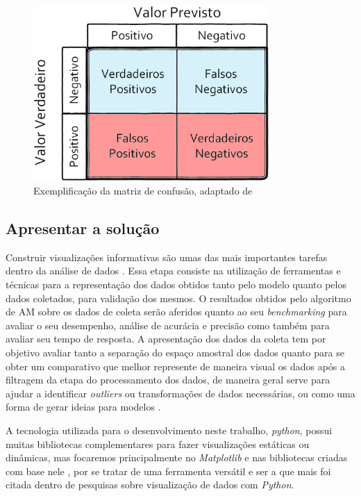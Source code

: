\begin{figure}[!htb]
	\centering
	\includegraphics[width=0.8\textwidth]{figuras/matriz_consusao.eps}
	\caption{Exemplificação da matriz de confusão, adaptado de }
	\label{matriz_consusao}
\end{figure}

\subsection{Apresentar a solução}
Construir visualizações informativas são umas das mais importantes tarefas dentro da análise de dados \cite{McKinney2012datapython}. Essa etapa consiste na utilização de ferramentas e técnicas para a representação dos dados obtidos tanto pelo modelo quanto pelos dados coletados, para validação dos mesmos. O resultados obtidos pelo algoritmo de AM sobre os dados de coleta serão aferidos quanto ao seu \textit{benchmarking} \cite{Benchmarking} para avaliar o seu desempenho, análise de acurácia e precisão como também para avaliar seu tempo de resposta. A apresentação dos dados da coleta tem por objetivo avaliar tanto a separação do espaço amostral dos dados quanto para se obter um comparativo que melhor represente de maneira visual os dados após a filtragem da etapa do processamento dos dados, de maneira geral serve para ajudar a identificar \textit{outliers} ou transformações de dados necessárias, ou como uma forma de gerar ideias para modelos \cite{McKinney2012datapython}.

A tecnologia utilizada para o desenvolvimento neste trabalho, \textit{python}, possui muitas bibliotecas complementares para fazer visualizações estáticas ou dinâmicas, mas focaremos principalmente no \textit{Matplotlib} e nas bibliotecas criadas com base nele \cite{McKinney2012datapython}, por se tratar de uma ferramenta versátil e ser a que mais foi citada dentro de pesquisas sobre visualização de dados com \textit{Python}.

